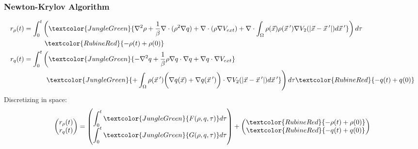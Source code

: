 \documentclass[aspectratio=169,xcolor=dvipsnames]{beamer}
\begin{document}
\begin{frame}
	\frametitle{Newton-Krylov Algorithm}
	\begin{align*}
	r_\rho(t) &  = \int_0^t \left(\textcolor{JungleGreen}{\nabla^2 \rho + \frac{1}{\beta}\nabla \cdot (\rho^2 \nabla q) + \nabla \cdot \left(\rho \nabla V_{ext}\right)
	+ \nabla \cdot \int_\Omega \rho(\vec{x}) \rho(\vec{x}\hspace{0.2em}') \nabla V_2(|\vec{x}-\vec{x}\hspace{0.2em}'|)d\vec{x}\hspace{0.2em}'} \right) d \tau\\
	& \qquad \quad  \textcolor{RubineRed}{- \rho(t) + \rho(0) }\\
	r_q(t) &  = \int_0^t \left(\textcolor{JungleGreen}{-\nabla^2 q + \frac{1}{\beta}\rho\nabla q \cdot   \nabla q  + \nabla q \cdot \nabla V_{ext}} \right.\\
	&\qquad \quad	\left. \textcolor{JungleGreen}{+ \int_\Omega \rho(\vec{x}\hspace{0.2em}') \bigg(\nabla q(\vec{x}) + \nabla q(\vec{x}\hspace{0.2em}')\bigg)\cdot  \nabla V_2(|\vec{x}-\vec{x}\hspace{0.2em}'|)d\vec{x}\hspace{0.2em}'} \right) d \tau \textcolor{RubineRed}{ - q(t) + q(0)}
\end{align*}
Discretizing in space:
\begin{align*}
	\begin{pmatrix}
		r_\rho(t) \\ 
		r_q(t) 
	\end{pmatrix}
= 
\begin{pmatrix}
	\displaystyle \int_0^t \textcolor{JungleGreen}{F(\rho, q, \tau)} d\tau\\
	\displaystyle \int_0^t \textcolor{JungleGreen}{G(\rho, q, \tau)} d\tau
\end{pmatrix} 
+ 
\begin{pmatrix}
	\textcolor{RubineRed}{- \rho(t) + \rho(0)}\\
	\textcolor{RubineRed}{- q(t) + q(0)}
\end{pmatrix}
\end{align*}
	
\end{frame}
\end{document}
